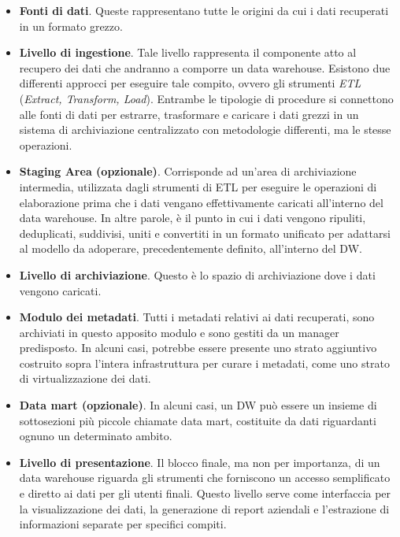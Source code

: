 \begin{itemize}
    \item \textbf{Fonti di dati}. Queste rappresentano tutte le origini da cui i dati recuperati in un formato grezzo.
    \item \textbf{Livello di ingestione}. Tale livello rappresenta il componente atto al recupero dei dati che andranno a comporre un data warehouse. Esistono due differenti approcci per eseguire tale compito, ovvero gli strumenti \textit{ETL} (\textit{Extract, Transform, Load}). Entrambe le tipologie di procedure si connettono alle fonti di dati per estrarre, trasformare e caricare i dati grezzi in un sistema di archiviazione centralizzato con metodologie differenti, ma le stesse operazioni.
    \item \textbf{Staging Area (opzionale)}. Corrisponde ad un'area di archiviazione intermedia, utilizzata dagli strumenti di ETL per eseguire le operazioni di elaborazione prima che i dati vengano effettivamente caricati all'interno del data warehouse. In altre parole, è il punto in cui i dati vengono ripuliti, deduplicati, suddivisi, uniti e convertiti in un formato unificato per adattarsi al modello da adoperare, precedentemente definito, all'interno del DW. 
    \item \textbf{Livello di archiviazione}. Questo è lo spazio di archiviazione dove i dati vengono caricati.
    \item \textbf{Modulo dei metadati}. Tutti i metadati relativi ai dati recuperati, sono archiviati in questo apposito modulo e sono gestiti da un manager predisposto. In alcuni casi, potrebbe essere presente uno strato aggiuntivo costruito sopra l'intera infrastruttura per curare i metadati, come uno strato di virtualizzazione dei dati. 
    \item \textbf{Data mart (opzionale)}. In alcuni casi, un DW può essere un insieme di sottosezioni più piccole chiamate data mart, costituite da dati riguardanti ognuno un determinato ambito.
    \item \textbf{Livello di presentazione}. Il blocco finale, ma non per importanza, di un data warehouse riguarda gli strumenti che forniscono un accesso semplificato e diretto ai dati per gli utenti finali. Questo livello serve come interfaccia per la visualizzazione dei dati, la generazione di report aziendali e l'estrazione di informazioni separate per specifici compiti.
\end{itemize}

